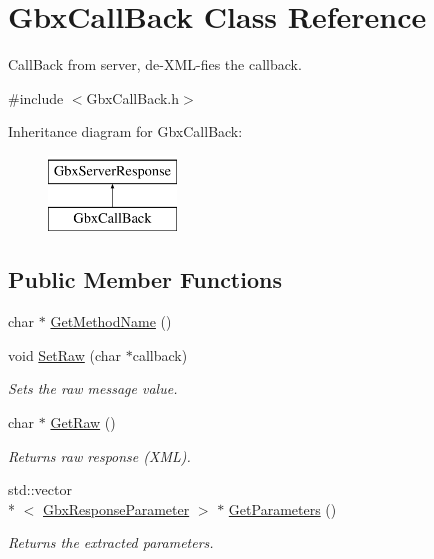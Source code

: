 \hypertarget{classGbxCallBack}{\section{Gbx\-Call\-Back Class Reference}
\label{classGbxCallBack}
}


Call\-Back from server, de-\/\-X\-M\-L-\/fies the callback.  




{\ttfamily \#include $<$Gbx\-Call\-Back.\-h$>$}

Inheritance diagram for Gbx\-Call\-Back\-:\begin{figure}[H]
\begin{center}
\leavevmode
\includegraphics[height=2.000000cm]{classGbxCallBack}
\end{center}
\end{figure}
\subsection*{Public Member Functions}
\begin{DoxyCompactItemize}
\item 
char $\ast$ \hyperlink{classGbxCallBack_a434467d6000e1546e85f94885a816946}{Get\-Method\-Name} ()
\item 
void \hyperlink{classGbxCallBack_a78a993170ce1e3c5a35f02088e4f66a0}{Set\-Raw} (char $\ast$callback)
\begin{DoxyCompactList}\small\item\em Sets the raw message value. \end{DoxyCompactList}\item 
char $\ast$ \hyperlink{classGbxServerResponse_a3105f299a4f6a0d997f909415a467fd5}{Get\-Raw} ()
\begin{DoxyCompactList}\small\item\em Returns raw response (X\-M\-L). \end{DoxyCompactList}\item 
std\-::vector\\*
$<$ \hyperlink{classGbxResponseParameter}{Gbx\-Response\-Parameter} $>$ $\ast$ \hyperlink{classGbxServerResponse_ab791b8d9edb964b909d3c70753549668}{Get\-Parameters} ()
\begin{DoxyCompactList}\small\item\em Returns the extracted parameters. \end{DoxyCompactList}\end{DoxyCompactItemize}
